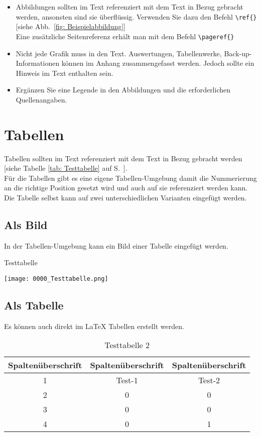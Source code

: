 \begin{itemize}
	\item	Abbildungen sollten im Text referenziert \bzw mit dem Text in Bezug gebracht werden, ansonsten sind sie überflüssig. Verwenden Sie dazu den Befehl \verb|\ref{}|
	[siehe Abb.~\ref{fig: Beispielabbildung}] \\
	Eine zusätzliche Seitenreferenz erhält man mit dem Befehl \verb|\pageref{}| 
	\item Nicht jede Grafik muss in den Text. Auswertungen, Tabellenwerke, Back-up-Informationen \etc können im Anhang zusammengefasst werden. Jedoch sollte ein Hinweis im Text enthalten sein.
	\item Ergänzen Sie \ggf eine Legende in den Abbildungen und die erforderlichen Quellenangaben.
\end{itemize}

\newpage
\section{Tabellen}
Tabellen sollten im Text referenziert \bzw mit dem Text in Bezug gebracht werden [siehe Tabelle \ref{tab: Testtabelle} auf S.~\pageref{tab: Testtabelle}].\\
Für die Tabellen gibt es eine eigene Tabellen-Umgebung damit die Nummerierung an die richtige Position gesetzt wird und auch auf sie referenziert werden kann.\\
Die Tabelle selbst kann auf zwei unterschiedlichen Varianten eingefügt werden.
\subsection{Als Bild}
In der Tabellen-Umgebung kann ein Bild einer Tabelle eingefügt werden.
\begin{table}[h]
	\centering
	\caption{Testtabelle}
	\texttt{[image: 0000\_Testtabelle.png]}
	\label{tab: Testtabelle} 
\end{table}
\subsection{Als Tabelle}
Es können auch direkt im {\LaTeX} Tabellen erstellt werden.
\begin{table}[h]
	\centering
	\caption{Testtabelle 2}
	\begin{tabular}{c|c||c|}
		Spaltenüberschrift & Spaltenüberschrift & Spaltenüberschrift \\
		\midrule[2pt]
		1 & Test-1 & Test-2\\ 
		\hline 2 & 0 & 0  \\ 
		3 & 0 & 0  \\ 
		4 & 0 & 1  \\
		\hline 
	\end{tabular}
	\label{tab: Testtabelle-2} 
\end{table}

